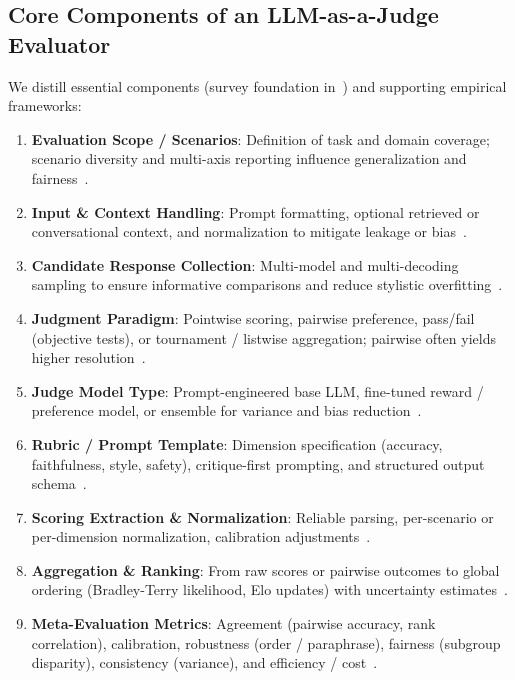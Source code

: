 \subsection{Core Components of an LLM-as-a-Judge Evaluator}
We distill essential components (survey foundation in~\cite{li2024_llmsasjudges}) and supporting empirical frameworks:
\begin{enumerate}
	\item \textbf{Evaluation Scope / Scenarios}: Definition of task and domain coverage; scenario diversity and multi-axis reporting influence generalization and fairness~\cite{liang2022helm, srivastava2022bigbench}.
	\item \textbf{Input \& Context Handling}: Prompt formatting, optional retrieved or conversational context, and normalization to mitigate leakage or bias~\cite{liang2022helm, hada2024metal}.
	\item \textbf{Candidate Response Collection}: Multi-model and multi-decoding sampling to ensure informative comparisons and reduce stylistic overfitting~\cite{zheng2023judgelm, chen2021evaluating}.
	\item \textbf{Judgment Paradigm}: Pointwise scoring, pairwise preference, pass/fail (objective tests), or tournament / listwise aggregation; pairwise often yields higher resolution~\cite{bradley1952rank, zheng2023judgelm, liu2024pairs, chen2021evaluating}.
	\item \textbf{Judge Model Type}: Prompt-engineered base LLM, fine-tuned reward / preference model, or ensemble for variance and bias reduction~\cite{stiennon2020learning, ouyang2022training, bavaresco2024judgebench}.
	\item \textbf{Rubric / Prompt Template}: Dimension specification (accuracy, faithfulness, style, safety), critique-first prompting, and structured output schema~\cite{fu2023gptscore, li2024_llmsasjudges}.
	\item \textbf{Scoring Extraction \& Normalization}: Reliable parsing, per-scenario or per-dimension normalization, calibration adjustments~\cite{liang2022helm, bavaresco2024judgebench}.
	\item \textbf{Aggregation \& Ranking}: From raw scores or pairwise outcomes to global ordering (Bradley-Terry likelihood, Elo updates) with uncertainty estimates~\cite{bradley1952rank, elo1978rating, zheng2023judgelm}.
	\item \textbf{Meta-Evaluation Metrics}: Agreement (pairwise accuracy, rank correlation), calibration, robustness (order / paraphrase), fairness (subgroup disparity), consistency (variance), and efficiency / cost~\cite{bavaresco2024judgebench, hada2024metal, li2024_llmsasjudges}.

\end{enumerate}
